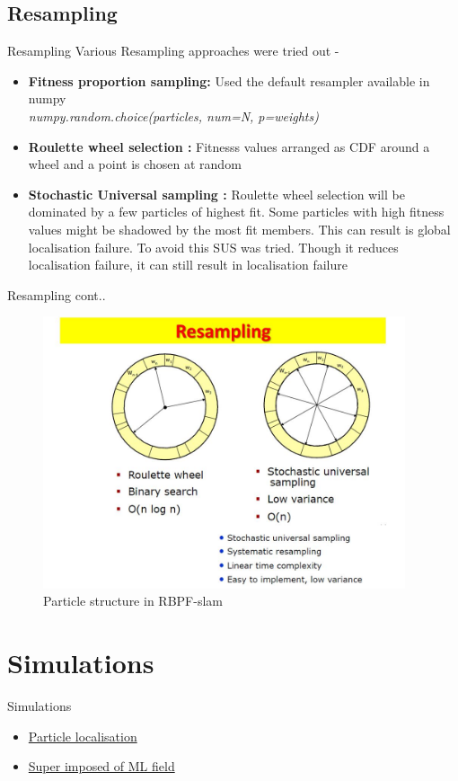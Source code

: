 \documentclass{beamer}
\begin{document}
\subsection{Resampling}
\begin{frame}{Resampling}
    Various Resampling approaches were tried out -
    \begin{itemize}
        \item \textbf{Fitness proportion sampling:} Used the default resampler available in numpy \\
            \textit{numpy.random.choice(particles, num=N, p=weights)}
        \item \textbf{Roulette wheel selection :} Fitnesss values arranged as CDF around a wheel and a point is chosen at random
        \item \textbf{Stochastic Universal sampling :} Roulette wheel selection will be dominated by a few particles of highest fit. Some particles with high fitness values might be shadowed by the most fit members. This can result is global localisation failure. To avoid this SUS was tried. Though it reduces localisation failure, it can still result in localisation failure  
    \end{itemize}
\end{frame}

\begin{frame}{Resampling cont..}
    \begin{figure}
        \includegraphics[height = 80mm]{./rl_multi.jpg}
        \caption{Particle structure in RBPF-slam}
    \end{figure}
\end{frame}


\section{Simulations}
\begin{frame}{Simulations}

    \begin{itemize}
        \item \href{https://github.com/aswinpajayan/seminar-related/blob/master/gifs/MCL-final.gif}{Particle localisation}
        \item \href{https://github.com/aswinpajayan/seminar-related/blob/master/gifs/sensorscans.gif}{Super imposed of ML field}
    \end{itemize}
\end{frame}
\end{document}
